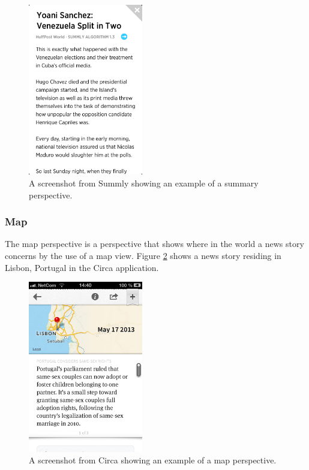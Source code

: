 \begin{figure}[!htbp]
\centering
\includegraphics[width=50mm]{GFX/perspectives/summaryViewSummly.png}
\caption{A screenshot from Summly showing an example of a summary perspective.}
\label{summary_summly}
\end{figure}

\subsubsection{Map}
The map perspective is a perspective that shows where in the world a news story concerns by the use of a map view. Figure \ref{map_circa} shows a news story residing in Lisbon, Portugal in the Circa application.

\begin{figure}[!htbp]
\centering
\includegraphics[width=50mm]{GFX/perspectives/mapViewCirca.png}
\caption{A screenshot from Circa showing an example of a map perspective.}
\label{map_circa}
\end{figure}


